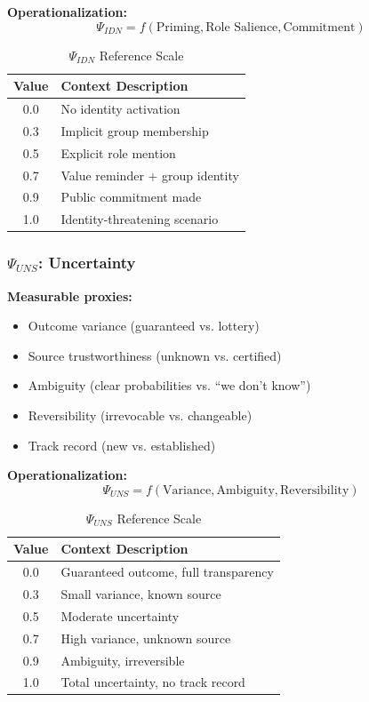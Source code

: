 \textbf{Operationalization:}
\begin{equation}
\Psi_{IDN} = f(\text{Priming}, \text{Role Salience}, \text{Commitment})
\end{equation}

\begin{table}[htbp]
\centering
\caption{$\Psi_{IDN}$ Reference Scale}
\begin{tabular}{@{}cl@{}}
\toprule
\textbf{Value} & \textbf{Context Description} \\
\midrule
0.0 & No identity activation \\
0.3 & Implicit group membership \\
0.5 & Explicit role mention \\
0.7 & Value reminder + group identity \\
0.9 & Public commitment made \\
1.0 & Identity-threatening scenario \\
\bottomrule
\end{tabular}
\end{table}

\subsubsection{$\Psi_{UNS}$: Uncertainty}

\textbf{Measurable proxies:}
\begin{itemize}
\item Outcome variance (guaranteed vs. lottery)
\item Source trustworthiness (unknown vs. certified)
\item Ambiguity (clear probabilities vs. ``we don't know'')
\item Reversibility (irrevocable vs. changeable)
\item Track record (new vs. established)
\end{itemize}

\textbf{Operationalization:}
\begin{equation}
\Psi_{UNS} = f(\text{Variance}, \text{Ambiguity}, \text{Reversibility})
\end{equation}

\begin{table}[htbp]
\centering
\caption{$\Psi_{UNS}$ Reference Scale}
\begin{tabular}{@{}cl@{}}
\toprule
\textbf{Value} & \textbf{Context Description} \\
\midrule
0.0 & Guaranteed outcome, full transparency \\
0.3 & Small variance, known source \\
0.5 & Moderate uncertainty \\
0.7 & High variance, unknown source \\
0.9 & Ambiguity, irreversible \\
1.0 & Total uncertainty, no track record \\
\bottomrule
\end{tabular}
\end{table}

